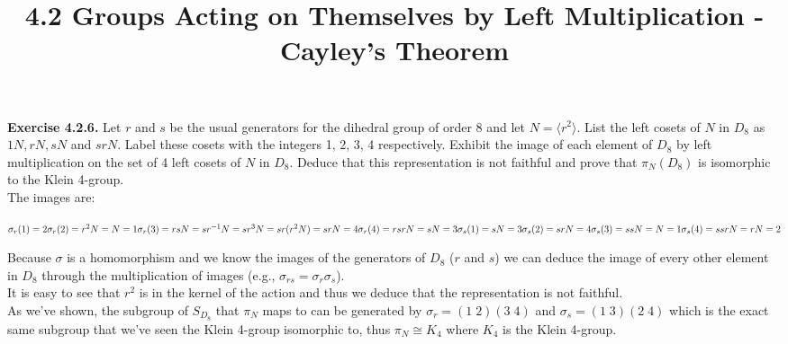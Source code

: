\documentclass{article}
\title{\textbf{4.2 Groups Acting on Themselves by Left Multiplication - Cayley's Theorem}}
\begin{document}
	\maketitle
	\textbf{Exercise 4.2.6.} Let $r$ and $s$ be the usual generators for the dihedral group of order 8 and let $N = \langle r^2 \rangle$. List the left cosets of $N$ in $D_8$ as $1N, rN, sN$ and $srN$. Label these cosets with the integers 1, 2, 3, 4 respectively. Exhibit the image of each element of $D_8$ by left multiplication on the set of 4 left cosets of $N$ in $D_8$. Deduce that this representation is not faithful and prove that $\pi_N(D_8)$ is isomorphic to the Klein 4-group. \\
	The images are: 
	\begin{itemize}
		$\sigma_r(1) = 2 \\
		\sigma_r(2) = r^2N = N = 1 \\
		\sigma_r(3) = rsN = sr^{-1}N = sr^3N = sr(r^2N) = srN = 4 \\
		\sigma_r(4) = rsrN = sN = 3 \\
		\sigma_s(1) = sN = 3 \\
		\sigma_s(2) = srN = 4 \\
		\sigma_s(3) = ssN = N  = 1 \\
		\sigma_s(4) = ssrN = rN = 2$
	\end{itemize}
	Because $\sigma$ is a homomorphism and we know the images of the generators of $D_8$ ($r$ and $s$) we can deduce the image of every other element in $D_8$ through the multiplication of images (e.g., $\sigma_{rs} = \sigma_r\sigma_s$). \\
	It is easy to see that $r^2$ is in the kernel of the action and thus we deduce that the representation is not faithful. \\
	As we've shown, the subgroup of $S_{D_8}$ that $\pi_N$ maps to can be generated by $\sigma_r = (1\; 2)(3\; 4)$ and $\sigma_s = (1\; 3)(2\; 4)$ which is the exact same subgroup that we've seen the Klein 4-group isomorphic to, thus $\pi_N \cong K_4$ where $K_4$ is the Klein 4-group.
\end{document}
